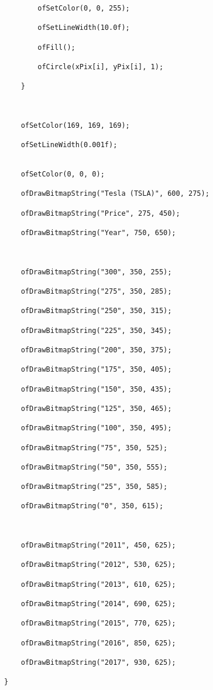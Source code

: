 \documentclass[letterpaper, 24pt, final, onecolumn, titlepage] {article}
\begin{document}
\begin{lstlisting}
        ofSetColor(0, 0, 255);

        ofSetLineWidth(10.0f);

        ofFill();

        ofCircle(xPix[i], yPix[i], 1);

    }



    ofSetColor(169, 169, 169);

    ofSetLineWidth(0.001f);


    ofSetColor(0, 0, 0);

    ofDrawBitmapString("Tesla (TSLA)", 600, 275);

    ofDrawBitmapString("Price", 275, 450);

    ofDrawBitmapString("Year", 750, 650);



    ofDrawBitmapString("300", 350, 255);

    ofDrawBitmapString("275", 350, 285);

    ofDrawBitmapString("250", 350, 315);

    ofDrawBitmapString("225", 350, 345);

    ofDrawBitmapString("200", 350, 375);

    ofDrawBitmapString("175", 350, 405);

    ofDrawBitmapString("150", 350, 435);

    ofDrawBitmapString("125", 350, 465);

    ofDrawBitmapString("100", 350, 495);

    ofDrawBitmapString("75", 350, 525);

    ofDrawBitmapString("50", 350, 555);

    ofDrawBitmapString("25", 350, 585);

    ofDrawBitmapString("0", 350, 615);



    ofDrawBitmapString("2011", 450, 625);

    ofDrawBitmapString("2012", 530, 625);

    ofDrawBitmapString("2013", 610, 625);

    ofDrawBitmapString("2014", 690, 625);

    ofDrawBitmapString("2015", 770, 625);

    ofDrawBitmapString("2016", 850, 625);

    ofDrawBitmapString("2017", 930, 625);

}


\end{lstlisting}
\end{document}
